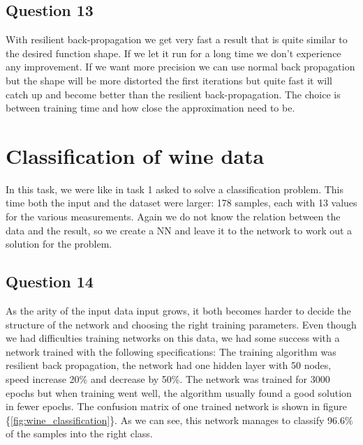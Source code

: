\documentclass[a4paper]{article}
\begin{document}
\subsection*{Question 13}
With resilient back-propagation we get very fast a result that is quite similar to the desired function shape. If we let it run for a long time we don't experience any improvement. If we want more precision we can use normal back propagation but the shape will be more distorted the first iterations but quite fast it will catch up and become better than the resilient back-propagation. The choice is between training time and how close the approximation need to be. 

\section{Classification of wine data}
In this task, we were like in task 1 asked to solve a classification problem. This time 
both the input and the dataset were larger: 178 samples, each with 13
values for the various measurements. Again we do not know 
the relation between the data and the result, 
so we create a NN and leave it to the network to work out a solution for the problem.

\subsection*{Question 14}
As the arity of the input data input grows, 
it both becomes harder to decide the structure of the network and 
choosing the right training parameters. Even though we had difficulties training 
networks 
on this data, we had some success with a 
network trained with the following specifications: The training algorithm was 
resilient back propagation, the network had one hidden layer with 50 
nodes, speed increase 20\% and decrease by 50\%. The network was trained for 
3000 epochs but when training went well, the algorithm usually found a good 
solution in fewer epochs. The confusion matrix 
of one trained network is shown in figure \{\ref{fig:wine_classification}\}. 
As we can see, this network manages to classify 96.6\% of the samples 
into the right class.
\end{document}
